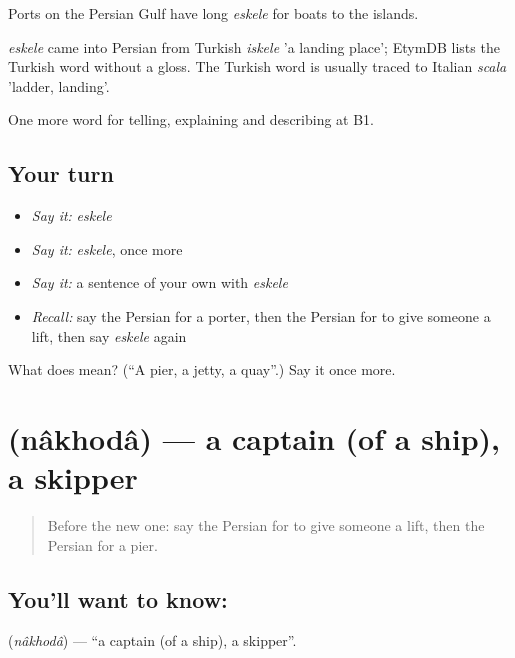 Ports on the Persian Gulf have long \emph{eskele} for boats to the islands.

\begin{cousinweb}
\emph{eskele} came into Persian from Turkish \emph{iskele} 'a landing place'; EtymDB lists the Turkish word without a gloss. The Turkish word is usually traced to Italian \emph{scala} 'ladder, landing'.
\end{cousinweb}

\begin{grammarlens}[title={What you've built}]
One more word for telling, explaining and describing at B1.
\end{grammarlens}

\subsection*{Your turn}
\begin{itemize}
\raggedright
  \item \emph{Say it:} \emph{eskele}
  \item \emph{Say it:} \emph{eskele}, once more
  \item \emph{Say it:} a sentence of your own with \emph{eskele}
  \item \emph{Recall:} say the Persian for a porter, then the Persian for to give someone a lift, then say \emph{eskele} again
\end{itemize}

\begin{tcolorbox}[breakable,colback=teal!4,colframe=teal!35!black,title={Before you move on}]
What does  mean? (\textquotedblleft{}A pier, a jetty, a quay\textquotedblright{}.) Say it once more.
\end{tcolorbox}
\section[\texorpdfstring{\fa{ناخدا} (nâkhodâ)}{ناخدا (nâkhodâ)}]{ (nâkhodâ) — a captain (of a ship), a skipper}

\label{lesson:FA-C436-nakhoda}



\begin{quote}
Before the new one: say the Persian for to give someone a lift, then the Persian for a pier.
\end{quote}

\subsection*{You'll want to know: }
\textbf{} (\emph{nâkhodâ}) — \textquotedblleft{}a captain (of a ship), a skipper\textquotedblright{}.

